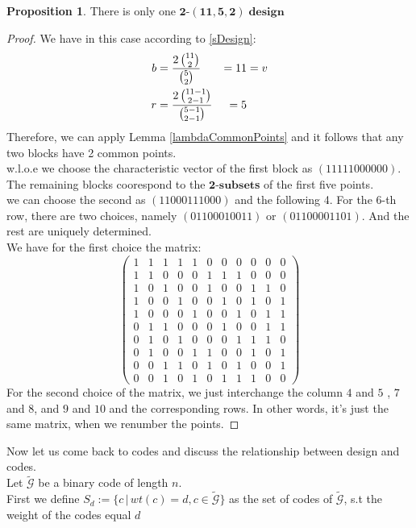 \documentclass[12pt]{article}
\theoremstyle{definition}
\newtheorem{prop}[theorem]{Proposition}
\numberwithin{equation}{theorem}
\numberwithin{figure}{theorem}
\newcommand{\tParamDesign}[4]{\ensuremath{\bm{#1\mbox{-}(#2,#3,#4)\; design}}}
\newcommand{\cCodes}{\ensuremath{\widetilde{\mathcal{G}}}}
\newcommand{\tSubset}[1]{\ensuremath{\bm{#1\mbox{-}{subset}}}}
\newcommand{\wloe}{w.l.o.e}
\begin{document}
\begin{prop}\label{onlyOneDesign}
There is only one \tParamDesign{2}{11}{5}{2}
\end{prop}
\begin{proof}
We have in this case according to \eqref{sDesign}:
\begin{alignat}{3}
	b &= \frac{2\,\binom{11}{2}}{\binom{5}{2}} & = 11 &= v \notag\\
	r &= \frac{2 \, \binom{11-1}{2 - 1}}{\binom{5-1}{2 - 1}} & = 5 & \notag\phantom{v} 
\end{alignat}
Therefore, we can apply Lemma \ref{lambdaCommonPoints} and it follows that any two blocks have 2 common points.\\
{\wloe} we choose the characteristic vector of the first block as 
$(1 1 1 1 1 0 0 0 0 0 0)$. The remaining blocks coorespond to the {\tSubset{2}}\textbf{s} of the first five points.\\
we can choose the second as $(1 1 0 0 0 1 1 1 0 0 0)$ and the following 4. For the $6$-th row, there are two choices, namely
$(0 1 1 0 0 0 1 0 0 1 1)$ or $(0 1 1 0 0 0 0 1 1 0 1)$. And the rest are uniquely determined. \\
We have for the first choice the matrix:
\[
	\begin{pmatrix}
 1 & 1 & 1 & 1 & 1 & 0 & 0 & 0 & 0 & 0 & 0 \\
 1 & 1 & 0 & 0 & 0 & 1 & 1 & 1 & 0 & 0 & 0 \\
 1 & 0 & 1 & 0 & 0 & 1 & 0 & 0 & 1 & 1 & 0 \\
 1 & 0 & 0 & 1 & 0 & 0 & 1 & 0 & 1 & 0 & 1 \\
 1 & 0 & 0 & 0 & 1 & 0 & 0 & 1 & 0 & 1 & 1 \\
 0 & 1 & 1 & 0 & 0 & 0 & 1 & 0 & 0 & 1 & 1 \\
 0 & 1 & 0 & 1 & 0 & 0 & 0 & 1 & 1 & 1 & 0 \\
 0 & 1 & 0 & 0 & 1 & 1 & 0 & 0 & 1 & 0 & 1 \\
 0 & 0 & 1 & 1 & 0 & 1 & 0 & 1 & 0 & 0 & 1 \\
 0 & 0 & 1 & 0 & 1 & 0 & 1 & 1 & 1 & 0 & 0 
	\end{pmatrix}
\]
For the second choice of the matrix, we just interchange the column $4$ and $5$ , $7$ and $8$, and $9$ and $10$ and the corresponding rows. In other words, it's just the same matrix, when we renumber the points.
\end{proof}
Now let us come back to codes and discuss the relationship between design and codes.\\
Let {\cCodes} be a binary code of length $n$.\\
First we define $S_d := \{c\,|\,wt(c) = d, c \in \cCodes\}$ as the set of codes of \cCodes, s.t the weight of the codes equal $d$
\end{document}

